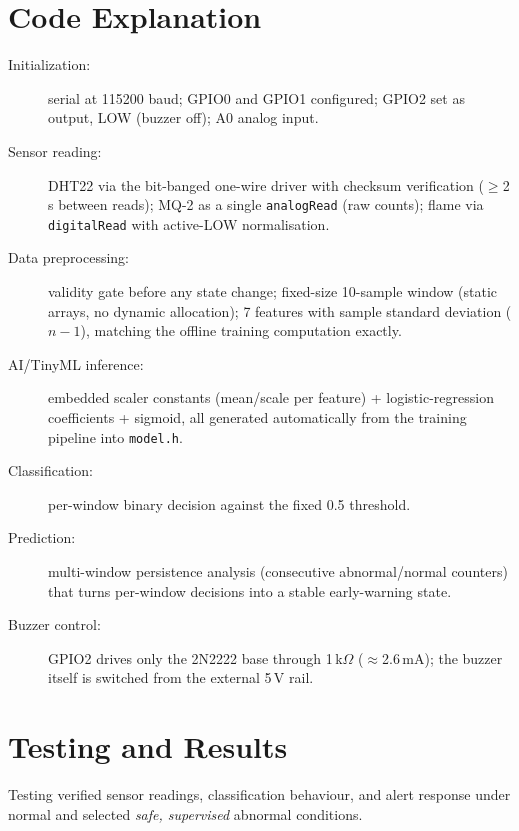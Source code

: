 \documentclass[11pt]{article}
\begin{document}
\section{Code Explanation}
\begin{description}
  \item[Initialization:] serial at 115200 baud; GPIO0 and GPIO1
    configured; GPIO2 set as output, LOW (buzzer off); A0 analog
    input.
  \item[Sensor reading:] DHT22 via the bit-banged one-wire driver with
    checksum verification ($\geq$2\,s between reads); MQ-2 as a single
    \texttt{analogRead} (raw counts); flame via
    \texttt{digitalRead} with active-LOW normalisation.
  \item[Data preprocessing:] validity gate before any state change;
    fixed-size 10-sample window (static arrays, no dynamic
    allocation); 7 features with sample standard deviation ($n-1$),
    matching the offline training computation exactly.
  \item[AI/TinyML inference:] embedded scaler constants
    (mean/scale per feature) + logistic-regression coefficients +
    sigmoid, all generated automatically from the training pipeline
    into \texttt{model.h}.
  \item[Classification:] per-window binary decision against the fixed
    0.5 threshold.
  \item[Prediction:] multi-window persistence analysis (consecutive
    abnormal/normal counters) that turns per-window decisions into a
    stable early-warning state.
  \item[Buzzer control:] GPIO2 drives only the 2N2222 base through
    1\,k$\Omega$ ($\approx$2.6\,mA); the buzzer itself is switched
    from the external 5\,V rail.
\end{description}

\section{Testing and Results}
Testing verified sensor readings, classification behaviour, and alert
response under normal and selected \emph{safe, supervised} abnormal
conditions.
\end{document}
